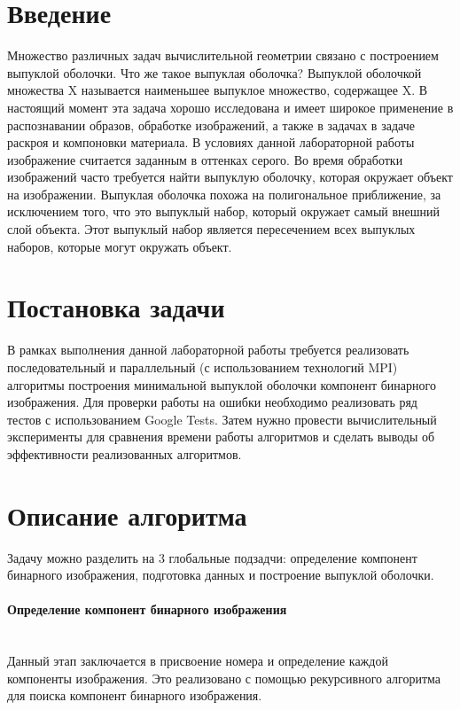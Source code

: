 \documentclass{report}
\begin{document}
\setcounter{page}{2}

\tableofcontents
\newpage

\section*{Введение}
\par Множество различных задач вычислительной геометрии связано с построением выпуклой оболочки. Что же такое выпуклая оболочка? Выпуклой оболочкой множества X называется наименьшее выпуклое множество, содержащее X. В настоящий момент эта задача хорошо исследована и имеет широкое применение в распознавании образов, обработке изображений, а также в задачах в задаче раскроя и компоновки материала. В условиях данной лабораторной работы изображение считается заданным в оттенках серого. Во время обработки изображений часто требуется найти выпуклую оболочку, которая окружает объект на изображении.  Выпуклая оболочка похожа на полигональное приближение, за исключением того, что это выпуклый набор, который окружает самый внешний слой объекта. Этот выпуклый набор является пересечением всех выпуклых наборов, которые могут окружать объект.
\newpage

\section*{Постановка задачи}
\par В рамках выполнения данной лабораторной работы требуется реализовать последовательный и параллельный (с использованием технологий MPI) алгоритмы построения минимальной выпуклой оболочки компонент бинарного изображения. Для проверки работы на ошибки необходимо реализовать ряд тестов с использованием Google Tests. Затем нужно провести вычислительный эксперименты для сравнения времени работы алгоритмов и сделать выводы об эффективности реализованных алгоритмов.
\newpage

\section*{Описание алгоритма}
\par Задачу можно разделить на 3 глобальные подзадчи: определение компонент бинарного изображения, подготовка данных и построение выпуклой оболочки.
\paragraph{Определение компонент бинарного изображения\\\\}
\par Данный этап заключается в присвоение номера и определение каждой компоненты изображения. Это реализовано с помощью рекурсивного алгоритма для поиска компонент бинарного изображения.
\end{document}
